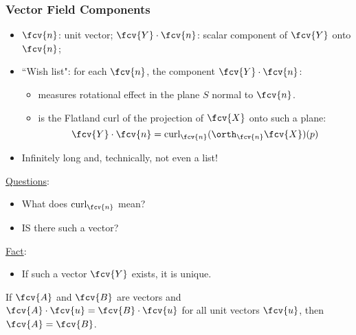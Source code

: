 
\begin{frame}
  \frametitle{Vector Field Components}

  \begin{itemize}
    \item $\fcv{n}$: unit vector; $\fcv{Y} \cdot \fcv{n}$: scalar component of $\fcv{Y}$ onto $\fcv{n}$;
    \item \pause ``Wish list": for each $\fcv{n}$, the component $\fcv{Y} \cdot \fcv{n}$:
    \begin{itemize}
      \item measures rotational effect in the plane $S$ normal to $\fcv{n}$.
      \item is the Flatland curl of the projection of $\fcv{X}$ onto such a plane:
  $$\fcv{Y} \cdot \fcv{n} = \text{curl}_{\fcv{n}} (\orth_{\fcv{n}} \fcv{X})(p)$$
    \end{itemize}
\item \pause Infinitely long and, technically, not even a list!
  \end{itemize}

\pause \underline{Questions}:
\begin{itemize}
  \item \pause What does $\text{curl}_{\fcv{n}}$ mean?
  \item \pause IS there such a vector?
\end{itemize}

\pause \underline{Fact}:
\begin{itemize}
  \item If such a vector $\fcv{Y}$ exists, it is unique.
\end{itemize}

If $\fcv{A}$ and $\fcv{B}$ are vectors and $\fcv{A}\cdot \fcv{u} = \fcv{B}\cdot \fcv{u}$ for all unit vectors $\fcv{u}$, then $\fcv{A}=\fcv{B}$.

\end{frame}